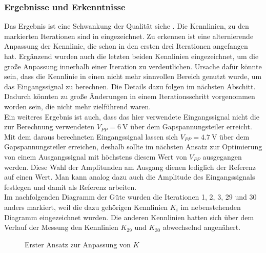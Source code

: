 \documentclass[../Report.tex]{subfiles}
\begin{document}
\subsubsection*{Ergebnisse und Erkenntnisse}
\label{subsubsec:opt.adjusta.results}
Das Ergebnis ist eine Schwankung der Qualität siehe . Die Kennlinien, zu den markierten Iterationen sind in  eingezeichnet. Zu erkennen ist eine alternierende Anpassung der Kennlinie, die schon in den ersten drei Iterationen angefangen hat. Ergänzend wurden auch die letzten beiden Kennlinien eingezeichnet, um die große Anpassung innerhalb einer Iteration zu verdeutlichen. Ursache dafür könnte sein, dass die Kennlinie in einen nicht mehr sinnvollen Bereich genutzt wurde, um das Eingangssignal zu berechnen. Die Details dazu folgen im nächsten Abschitt. Dadurch könnten zu große Änderungen in einem Iterationsschritt vorgenommen worden sein, die nicht mehr zielführend waren.\\
Ein weiteres Ergebnis ist auch, dass das hier verwendete Eingangssignal nicht die zur Berechnung verwendeten $V_{PP} = \SI{6}{\V}$ über dem Gapspannungsteiler erreicht. Mit dem daraus berechneten Eingangssignal lassen sich $V_{PP} = \SI{4,7}{\V}$ über dem Gapspannungsteiler erreichen, deshalb sollte im nächsten Ansatz zur Optimierung von einem Ausgangssignal mit höchstens diesem Wert von $V_{PP}$ ausgegangen werden. Diese Wahl der Amplitunden am Ausgang dienen lediglich der Referenz auf einen Wert. Man kann analog dazu auch die Amplitude des Eingangssignals festlegen und damit als Referenz arbeiten.\\
Im nachfolgenden Diagramm der Güte wurden die Iterationen 1, 2, 3, 29 und 30 anders markiert, weil die dazu gehörigen Kennlinien $K_i$ im nebenstehenden Diagramm eingezeichnet wurden. Die anderen Kennlinien hatten sich über dem Verlauf der Messung den Kennlinien $K_{29}$ und $K_{30}$ abwechselnd angenähert.
\begin{figure}[H]
\begin{subfigure}{0.5 \textwidth}
    \newlength\figureheight
	\newlength\figurewidth
	\setlength\figureheight{7.5cm}
	\setlength\figurewidth{7.5cm}
    
	\label{fig:evaluate30K}
\end{subfigure}
\begin{subfigure}{0.5 \textwidth}
	\setlength\figureheight{7.5cm}
	\setlength\figurewidth{7.5cm}
    
	\label{fig:evaluate30Q}
\end{subfigure}
\label{fig:opt.evaluate30}
\caption{Erster Ansatz zur Anpassung von $K$}
\end{figure}
\end{document}
